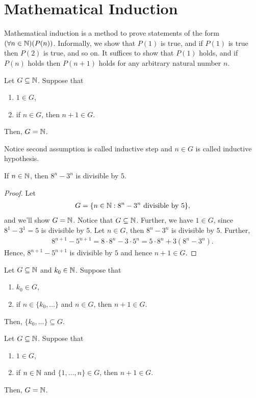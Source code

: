 \documentclass[a4paper,english,12pt]{article}
\begin{document}
\section{Mathematical Induction}
Mathematical induction is a method to prove statements of the form $(\forall n \in \mathbb{N})(P(n))$. Informally, we show that $P(1)$ is true, and if $P(1)$ is true then $P(2)$ is true, and so on. It suffices to show that $P(1)$ holds, and if $P(n)$ holds then $P(n+1)$ holds for any arbitrary natural number $n$.
\begin{thm} Let $G \subseteq \mathbb{N}$. Suppose that
\begin{enumerate}
	\item $1 \in G$,
	\item if $n \in G$, then $n+1 \in G$.
\end{enumerate}
Then, $G = \mathbb{N}$.
\end{thm}
\begin{rem} Notice second assumption is called inductive step and $n \in G$ is called inductive hypothesis.
\end{rem}
\begin{exmp} If $n \in \mathbb{N}$, then $8^n - 3^n$ is divisible by $5$.
\end{exmp}
\begin{proof} Let 
\begin{align*}
G = \{ n \in \mathbb{N} : 8^n - 3^n \text{ divisible by } 5\},
\end{align*}
and we'll show $G = \mathbb{N}$. Notice that $G \subseteq \mathbb{N}$. Further, we have $1 \in G$, since $8^1 - 3^1 = 5$ is divisible by $5$. Let $n \in G$, then $8^n - 3^n$ is divisible by $5$. Further, 
\begin{align*}
8^{n+1}-5^{n+1}= 8\cdot 8^n - 3 \cdot 5^n = 5 \cdot 8^n + 3(8^n-3^n).
\end{align*}
Hence, $8^{n+1}- 5^{n+1}$ is divisible by $5$ and hence $n+1 \in G$.
\end{proof}
\begin{thm} Let $G \subseteq \mathbb{N}$ and $k_0 \in \mathbb{N}$. Suppose that
\begin{enumerate}
	\item $k_0 \in G$,
	\item if $n \in \{k_0, \ldots\}$ and $n \in G$, then $n+1 \in G$.
\end{enumerate}
Then, $\{k_0,\ldots\} \subseteq G$.
\end{thm}
\begin{thm} Let $G \subseteq \mathbb{N}$. Suppose that
\begin{enumerate}
	\item $1 \in G$,
	\item if $n \in \mathbb{N}$ and $\{1, \ldots, n\} \in G$, then $n+1 \in G$.
\end{enumerate}
Then, $G = \mathbb{N}$.
\end{thm}
\end{document}

